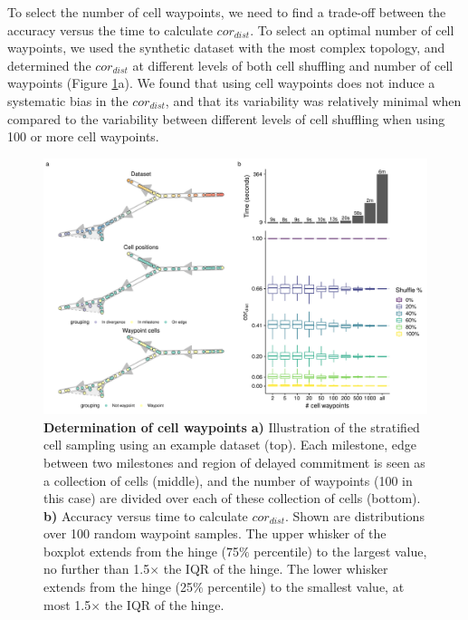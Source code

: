 To select the number of cell waypoints, we need to find a trade-off between the accuracy versus the time to calculate $\textit{cor}_{\textit{dist}}$. To select an optimal number of cell waypoints, we used the synthetic dataset with the most complex topology, and determined the $\textit{cor}_{\textit{dist}}$ at different levels of both cell shuffling and number of cell waypoints (Figure \ref{fig:snote1fig_5}a). We found that using cell waypoints does not induce a systematic bias in the $\textit{cor}_{\textit{dist}}$, and that its variability was relatively minimal when compared to the variability between different levels of cell shuffling when using 100 or more cell waypoints.

\begin{figure}
	\centering\includegraphics[width=\linewidth]{fig/dynbenchmark/snote1fig_5.pdf}
	\caption{
		\textbf{Determination of cell waypoints} \textbf{a)} Illustration of the stratified cell sampling using an example dataset (top). Each milestone, edge between two milestones and region of delayed commitment is seen as a collection of cells (middle), and the number of waypoints (100 in this case) are divided over each of these collection of cells (bottom). \textbf{b)} Accuracy versus time to calculate $\textit{cor}_{\textit{dist}}$. Shown are distributions over 100 random waypoint samples. The upper whisker of the boxplot extends from the hinge (75$\%$ percentile) to the largest value, no further than 1.5$\times$ the IQR of the hinge. The lower whisker extends from the hinge (25$\%$ percentile) to the smallest value, at most 1.5$\times$ the IQR of the hinge.
	}
	\label{fig:snote1fig_5}
\end{figure}

